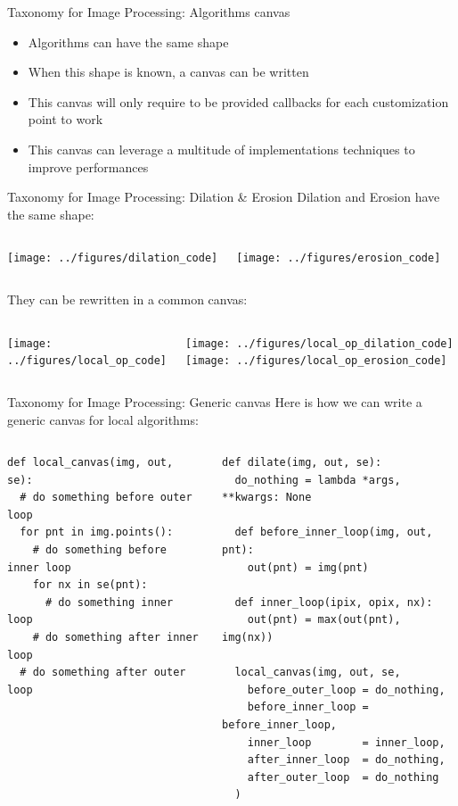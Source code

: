 \documentclass[12pt,aspectratio=169]{beamer}
\begin{document}
\begin{frame}[fragile]{Taxonomy for Image Processing: Algorithms canvas}
  \begin{itemize}
    \item Algorithms can have the same shape
    \item When this shape is known, a canvas can be written
    \item This canvas will only require to be provided callbacks for each customization point to work
    \item This canvas can leverage a multitude of implementations techniques to improve performances
  \end{itemize}
\end{frame}

\begin{frame}[fragile]{Taxonomy for Image Processing: Dilation \& Erosion}
  Dilation and Erosion have the same shape:
  \begin{columns}[T,onlytextwidth]
    \texttt{[image: ../figures/dilation\_code]}

    \texttt{[image: ../figures/erosion\_code]}
  \end{columns}
  \bigskip
  They can be rewritten in a common canvas:
  \begin{columns}[T,onlytextwidth]
    \texttt{[image: ../figures/local\_op\_code]}

    \texttt{[image: ../figures/local\_op\_dilation\_code]}
    \texttt{[image: ../figures/local\_op\_erosion\_code]}
  \end{columns}
\end{frame}

\begin{frame}[fragile]{Taxonomy for Image Processing: Generic canvas}
  Here is how we can write a generic canvas for local algorithms:
  \begin{columns}[T,onlytextwidth]
    \begin{verbatim}
def local_canvas(img, out, se):
  # do something before outer loop
  for pnt in img.points():
    # do something before inner loop
    for nx in se(pnt):
      # do something inner loop
    # do something after inner loop
  # do something after outer loop
\end{verbatim}

    \begin{verbatim}
def dilate(img, out, se):
  do_nothing = lambda *args, **kwargs: None

  def before_inner_loop(img, out, pnt):
    out(pnt) = img(pnt)

  def inner_loop(ipix, opix, nx):
    out(pnt) = max(out(pnt), img(nx))

  local_canvas(img, out, se,
    before_outer_loop = do_nothing,
    before_inner_loop = before_inner_loop,
    inner_loop        = inner_loop,
    after_inner_loop  = do_nothing,
    after_outer_loop  = do_nothing
  )
\end{verbatim}
  \end{columns}
\end{frame}
\end{document}
